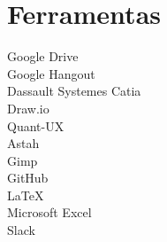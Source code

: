 \chapter{Ferramentas}
\begin{description}
    \item[Google Drive]
    \item[Google Hangout]
    \item[Dassault Systemes Catia]
    \item[Draw.io]
    \item[Quant-UX]
    \item[Astah]
    \item[Gimp]
    \item[GitHub]
    \item[LaTeX]
    \item[Microsoft Excel]
    \item[Slack]
\end{description}
